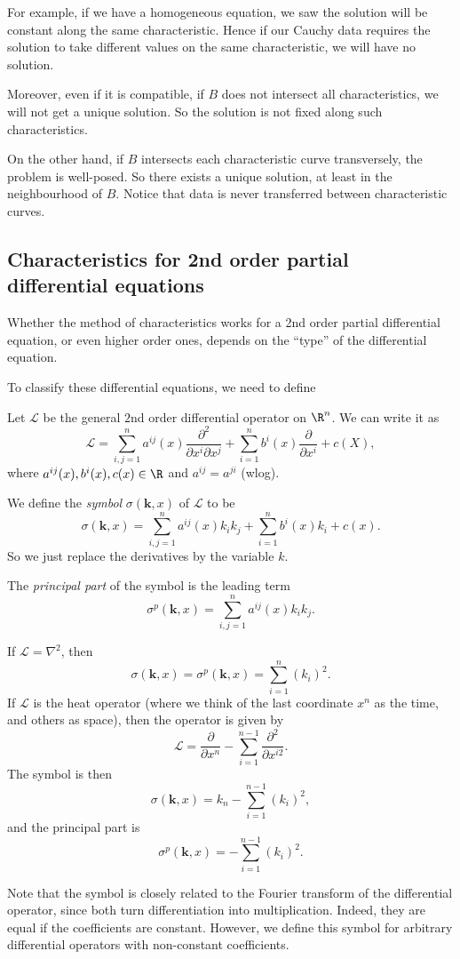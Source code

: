 \documentclass[a4paper]{article}
\begin{document}
For example, if we have a homogeneous equation, we saw the solution will be constant along the same characteristic. Hence if our Cauchy data requires the solution to take different values on the same characteristic, we will have no solution.

Moreover, even if it is compatible, if $B$ does not intersect all characteristics, we will not get a unique solution. So the solution is not fixed along such characteristics.

On the other hand, if $B$ intersects each characteristic curve transversely, the problem is well-posed. So there exists a unique solution, at least in the neighbourhood of $B$. Notice that data is never transferred between characteristic curves.

\subsection{Characteristics for 2nd order partial differential equations}
Whether the method of characteristics works for a 2nd order partial differential equation, or even higher order ones, depends on the ``type'' of the differential equation.

To classify these differential equations, we need to define

\begin{defi}
  Let $\mathcal{L}$ be the general $2$nd order differential operator on $\R^n$. We can write it as
  \[
    \mathcal{L} = \sum_{i, j = 1}^n a^{ij}(x) \frac{\partial^2}{\partial x^i \partial x^j} + \sum_{i = 1}^n b^i(x) \frac{\partial}{\partial x^i} + c(X),
  \]
  where $a^{ij}(x), b^i(x), c(x) \in \R$ and $a^{ij} = a^{ji}$ (wlog).

  We define the \emph{symbol} $\sigma(\mathbf{k}, x)$ of $\mathcal{L}$ to be
  \[
    \sigma(\mathbf{k}, x) = \sum_{i, j = 1}^n a^{ij} (x) k_i k_j + \sum_{i = 1}^n b^i(x) k_i + c(x).
  \]
  So we just replace the derivatives by the variable $k$.

  The \emph{principal part} of the symbol is the leading term
  \[
    \sigma^p(\mathbf{k}, x) = \sum_{i, j = 1}^n a^{ij} (x) k_i k_j.
  \]
\end{defi}

\begin{eg}
  If $\mathcal{L} = \nabla^2$, then
  \[
    \sigma(\mathbf{k}, x) = \sigma^p(\mathbf{k}, x) = \sum_{i = 1}^n (k_i)^2.
  \]
  If $\mathcal{L}$ is the heat operator (where we think of the last coordinate $x^n$ as the time, and others as space), then the operator is given by
  \[
    \mathcal{L} = \frac{\partial}{\partial x^n} - \sum_{i = 1}^{n - 1}\frac{\partial^2}{\partial x^{i2}}.
  \]
  The symbol is then
  \[
    \sigma(\mathbf{k}, x) = k_n - \sum_{i = 1}^{n - 1} (k_i)^2,
  \]
  and the principal part is
  \[
    \sigma^p (\mathbf{k}, x) = -\sum_{i = 1}^{n - 1}(k_i)^2.
  \]
\end{eg}
Note that the symbol is closely related to the Fourier transform of the differential operator, since both turn differentiation into multiplication. Indeed, they are equal if the coefficients are constant. However, we define this symbol for arbitrary differential operators with non-constant coefficients.
\end{document}
